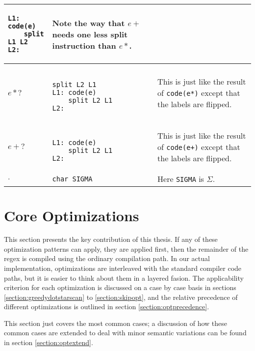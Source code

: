 \begin{table}[ht]
\begin{tabular}{| l | l | p{8cm} |}
\begin{minipage}{3cm}
\begin{verbatim}
L1: code(e)
    split L1 L2
L2: 
  \end{verbatim}
  \end{minipage}
  & Note the way that $e+$ needs one less split instruction than $e*$. \\ \hline
$e*?$ &
  \begin{minipage}{3cm}
  \begin{verbatim}

split L2 L1
L1: code(e)
    split L2 L1
L2: 
  \end{verbatim}
  \end{minipage}
  & This is just like the result of \verb'code(e*)' except that the
    labels are flipped. \\ \hline
$e+?$ &
  \begin{minipage}{3cm}
  \begin{verbatim}

L1: code(e)
    split L2 L1
L2: 
  \end{verbatim}
  \end{minipage}
  & This is just like the result of \verb'code(e+)' except that the
    labels are flipped. \\ \hline
$.$ & \verb'char SIGMA' & Here \verb'SIGMA' is $\Sigma$. \\ \hline
\end{tabular}
\end{table}

\section{Core Optimizations}
\label{section:skipscanopt}

This section presents the key contribution of this thesis. If any of
these optimization patterns can apply, they are applied first, then
the remainder of the regex is compiled using the ordinary compilation
path. In our actual implementation, optimizations are interleaved with
the standard compiler code paths, but it is easier to think about
them in a layered fasion. The applicability criterion for each
optimization is discussed on a case by case basis in sections
\ref{section:greedydotstarscan} to \ref{section:skipopt},
and the relative precedence of different
optimizations is outlined in section \ref{section:optprecedence}.

This section just covers the most common cases; a discussion of
how these common cases are extended to deal with minor semantic
variations can be found in section \ref{section:optextend}.

